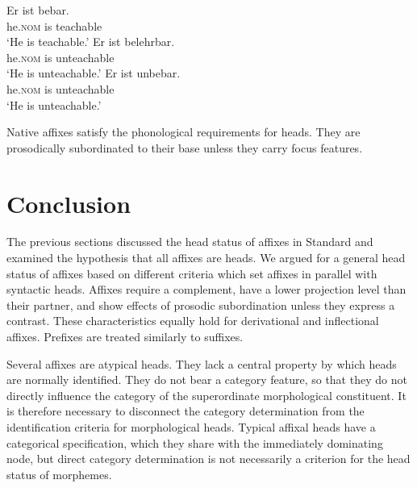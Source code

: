 \documentclass[output=paper
  ,nobabel
  ,draftmode
  ,colorlinks, citecolor=brown
]{langscibook}
\begin{document}
\eal
\ex
\gll Er ist bebar. \\
	he.\textsc{nom} is teachable\\
\glt	`He is teachable.'
\ex 
\gll Er              ist belehrbar.\\ 
     he.\textsc{nom} is  unteachable\\
\glt `He is unteachable.'
\ex
\gll Er              ist unbebar. \\
     he.\textsc{nom} is  unteachable\\
\glt `He is unteachable.'
\zl

\noindent 
Native affixes satisfy the phonological requirements for heads. They are prosodically subordinated to their base unless they carry focus features.

\section{Conclusion}\label{conclu-kor}

The previous sections discussed the head status of affixes in Standard  and examined the hypothesis that all affixes are heads. We argued for a general head status of affixes based on different criteria which set affixes in parallel with syntactic heads. Affixes require a complement, have a lower projection level than their partner, and show effects of prosodic subordination unless they express a contrast. These characteristics equally hold for derivational and inflectional affixes. Prefixes are treated similarly to suffixes.

Several affixes are atypical heads. They lack a central property by which heads are normally identified. They do not bear a category feature, so that they do not directly influence the category of the superordinate morphological constituent. It is therefore necessary to disconnect the category determination from the identification criteria for morphological heads. Typical affixal heads have a categorical specification, which they share with the immediately dominating node, but direct category determination is not necessarily a criterion for the head status of morphemes.
\end{document}

